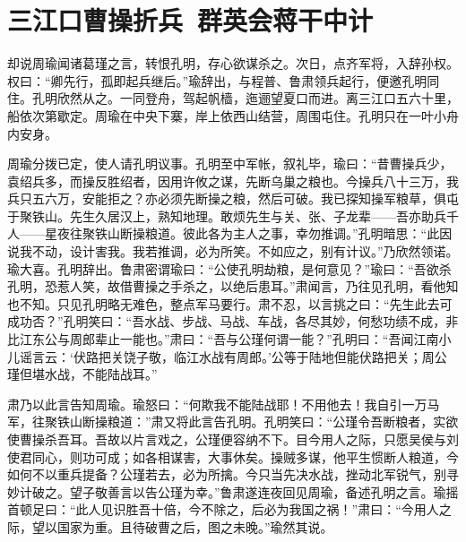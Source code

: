 \chapter{三江口曹操折兵~群英会蒋干中计}

却说周瑜闻诸葛瑾之言，转恨孔明，存心欲谋杀之。次日，点齐军将，入辞孙权。权曰：“卿先行，孤即起兵继后。”瑜辞出，与程普、鲁肃领兵起行，便邀孔明同住。孔明欣然从之。一同登舟，驾起帆樯，迤逦望夏口而进。离三江口五六十里，船依次第歇定。周瑜在中央下寨，岸上依西山结营，周围屯住。孔明只在一叶小舟内安身。

周瑜分拨已定，使人请孔明议事。孔明至中军帐，叙礼毕，瑜曰：“昔曹操兵少，袁绍兵多，而操反胜绍者，因用许攸之谋，先断乌巢之粮也。今操兵八十三万，我兵只五六万，安能拒之？亦必须先断操之粮，然后可破。我已探知操军粮草，俱屯于聚铁山。先生久居汉上，熟知地理。敢烦先生与关、张、子龙辈——吾亦助兵千人——星夜往聚铁山断操粮道。彼此各为主人之事，幸勿推调。”孔明暗思：“此因说我不动，设计害我。我若推调，必为所笑。不如应之，别有计议。”乃欣然领诺。瑜大喜。孔明辞出。鲁肃密谓瑜曰：“公使孔明劫粮，是何意见？”瑜曰：“吾欲杀孔明，恐惹人笑，故借曹操之手杀之，以绝后患耳。”肃闻言，乃往见孔明，看他知也不知。只见孔明略无难色，整点军马要行。肃不忍，以言挑之曰：“先生此去可成功否？”孔明笑曰：“吾水战、步战、马战、车战，各尽其妙，何愁功绩不成，非比江东公与周郎辈止一能也。”肃曰：“吾与公瑾何谓一能？”孔明曰：“吾闻江南小儿谣言云：‘伏路把关饶子敬，临江水战有周郎。’公等于陆地但能伏路把关；周公瑾但堪水战，不能陆战耳。”

肃乃以此言告知周瑜。瑜怒曰：“何欺我不能陆战耶！不用他去！我自引一万马军，往聚铁山断操粮道：”肃又将此言告孔明。孔明笑曰：“公瑾令吾断粮者，实欲使曹操杀吾耳。吾故以片言戏之，公瑾便容纳不下。目今用人之际，只愿吴侯与刘使君同心，则功可成；如各相谋害，大事休矣。操贼多谋，他平生惯断人粮道，今如何不以重兵提备？公瑾若去，必为所擒。今只当先决水战，挫动北军锐气，别寻妙计破之。望子敬善言以告公瑾为幸。”鲁肃遂连夜回见周瑜，备述孔明之言。瑜摇首顿足曰：“此人见识胜吾十倍，今不除之，后必为我国之祸！”肃曰：“今用人之际，望以国家为重。且待破曹之后，图之未晚。”瑜然其说。

